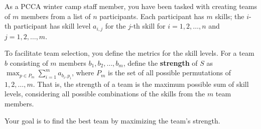 As a PCCA winter camp staff member, you have been tasked with creating teams of $m$ members from a list of $n$ participants.
Each participant has $m$ skills; the $i$-th participant has skill level $a_{i,j}$ for the $j$-th skill for $i = 1,2,\ldots,n$ and $j = 1,2,\ldots,m$.

To facilitate team selection, you define the metrics for the skill levels.
For a team $b$ consisting of $m$ members $b_1,b_2,\ldots,b_m$, define the \textbf{strength} of $S$ as $\displaystyle\max_{p \in P_m} \sum_{i=1}^{m} a_{b_i,p_i}$, where $P_m$ is the set of all possible permutations of $1,2,\ldots,m$.
That is, the strength of a team is the maximum possible sum of skill levels, considering all possible combinations of the skills from the $m$ team members.

Your goal is to find the best team by maximizing the team's strength.